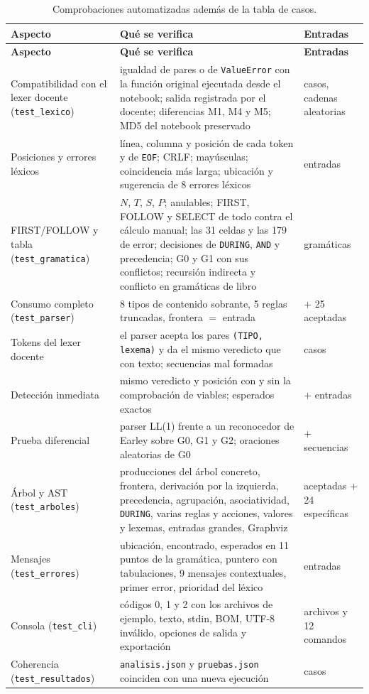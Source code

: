 \documentclass[11pt,letterpaper]{article}
\newcommand{\cod}[1]{\texttt{#1}}
\newcommand{\ruta}[1]{\nolinkurl{#1}}
\newcommand{\T}[1]{\texttt{#1}}
\newcommand{\cabeza}{\rowcolor{cabecera}}
\begin{document}
\begin{longtable}{>{\raggedright}p{3.4cm}>{\raggedright}p{9.0cm}>{\raggedright\arraybackslash}p{3.2cm}}
\caption{Comprobaciones automatizadas además de la tabla de casos.}\label{tab:adicionales}\\
\hline\cabeza \textbf{Aspecto} & \textbf{Qué se verifica} & \textbf{Entradas}\\\hline\endfirsthead
\hline\cabeza \textbf{Aspecto} & \textbf{Qué se verifica} & \textbf{Entradas}\\\hline\endhead
Compatibilidad con el lexer docente (\ruta{test_lexico}) & igualdad de pares o de \T{ValueError} con la función
original ejecutada desde el notebook; salida registrada por el docente; diferencias M1, M4 y M5; MD5 del notebook
preservado & 42 casos, \NumComparadasLexico{} cadenas aleatorias\\
Posiciones y errores léxicos & línea, columna y posición de cada token y de \T{EOF}; CRLF; mayúsculas; coincidencia más
larga; ubicación y sugerencia de 8 errores léxicos & 17 entradas\\
FIRST/FOLLOW y tabla (\ruta{test_gramatica}) & $N$, $T$, $S$, $P$; anulables; FIRST, FOLLOW y SELECT de todo contra el
cálculo manual; las 31 celdas y las 179 de error; decisiones de \T{DURING}, \T{AND} y precedencia; G0 y G1 con sus
conflictos; recursión indirecta y conflicto en gramáticas de libro & 5 gramáticas\\
Consumo completo (\ruta{test_parser}) & 8 tipos de contenido sobrante, 5 reglas truncadas, frontera $=$ entrada &
13 + 25 aceptadas\\
Tokens del lexer docente & el parser acepta los pares \T{(TIPO, lexema)} y da el mismo veredicto que con texto;
secuencias mal formadas & 38 casos\\
Detección inmediata & mismo veredicto y posición con y sin la comprobación de viables; esperados exactos &
\NumCasos{} + \NumMutacionesInmediata{} entradas\\
Prueba diferencial & parser LL(1) frente a un reconocedor de Earley sobre G0, G1 y G2; oraciones aleatorias de G0 &
\NumDiferenciales{} + \NumOracionesGcero{} secuencias\\
Árbol y AST (\ruta{test_arboles}) & producciones del árbol concreto, frontera, derivación por la izquierda, precedencia,
agrupación, asociatividad, \T{DURING}, varias reglas y acciones, valores y lexemas, entradas grandes, Graphviz &
25 aceptadas + 24 específicas\\
Mensajes (\ruta{test_errores}) & ubicación, encontrado, esperados en 11 puntos de la gramática, puntero con
tabulaciones, 9 mensajes contextuales, primer error, prioridad del léxico & 25 entradas\\
Consola (\ruta{test_cli}) & códigos 0, 1 y 2 con los \NumEjemplos{} archivos de ejemplo, texto, stdin, BOM, UTF-8 inválido,
opciones de salida y exportación & \NumEjemplos{} archivos y 12 comandos\\
Coherencia (\ruta{test_resultados}) & \cod{analisis.json} y \cod{pruebas.json} coinciden con una nueva ejecución &
\NumCasos{} casos\\\hline
\end{longtable}
\end{document}
